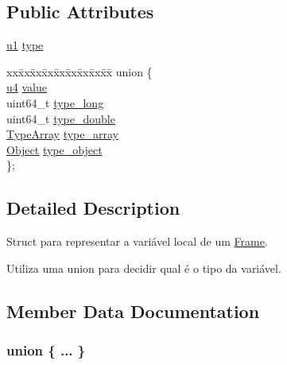 \subsection*{Public Attributes}
\begin{DoxyCompactItemize}
\item 
\hyperlink{structures_8h_a64f8055b64cf2a4c299c841130c5c938}{u1} \hyperlink{structLocalVariable_a05438f40d41a69cde0a4d50a37bf9420}{type}
\item 
\begin{tabbing}
xx\=xx\=xx\=xx\=xx\=xx\=xx\=xx\=xx\=\kill
union \{\\
\>\hyperlink{structures_8h_ae391a1d79bb0c8cbc283f0283e3c098b}{u4} \hyperlink{structLocalVariable_aee58138d840bf24f71cd8c4fd2f84db7}{value}\\
\>uint64\_t \hyperlink{structLocalVariable_af14e5709d8a7c9397571316821b9171b}{type\_long}\\
\>uint64\_t \hyperlink{structLocalVariable_a488dfde0ac92dbb3f2b4d56280771141}{type\_double}\\
\>\hyperlink{structTypeArray}{TypeArray} \hyperlink{structLocalVariable_a6905d4b07d1ff41deaa0189ae8761850}{type\_array}\\
\>\hyperlink{structObject}{Object} \hyperlink{structLocalVariable_ae6f28a6c3ea7313de860a8e46adf661f}{type\_object}\\
\}; \\

\end{tabbing}\end{DoxyCompactItemize}


\subsection{Detailed Description}
Struct para representar a variável local de um \hyperlink{structFrame}{Frame}. 

Utiliza uma union para decidir qual é o tipo da variável. 

\subsection{Member Data Documentation}
\subsubsection[{\texorpdfstring{"@36}{@36}}]{\setlength{\rightskip}{0pt plus 5cm}union \{ ... \} }\hypertarget{structLocalVariable_a3570d34d2fed3081d2b7a21bb07cf290}{}\label{structLocalVariable_a3570d34d2fed3081d2b7a21bb07cf290}
